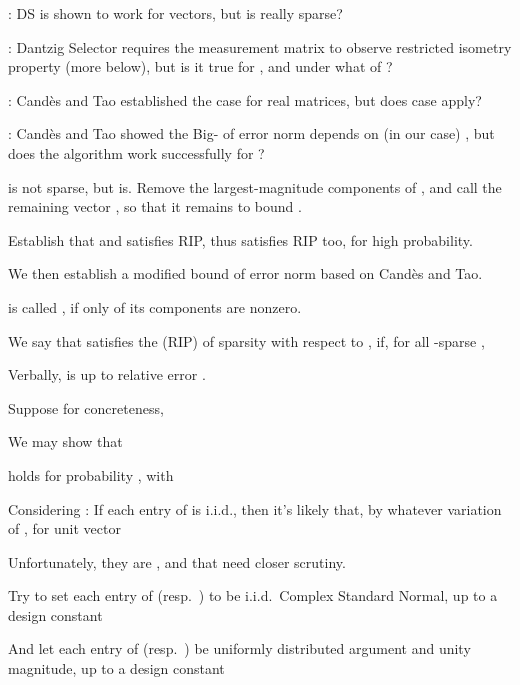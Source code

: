 {
\I {}: DS is shown to work for  vectors, but is  really sparse?

\I {}: Dantzig Selector requires the measurement matrix to observe restricted isometry property (more below), but is it true for , and under what  of ?

\I {}: Candès and Tao established the case for real matrices, but does  case apply?

\I {}: Candès and Tao showed the Big- of error norm depends on (in our case) , but does the algorithm work successfully for ?
}
{
\I {} is not sparse, but  is.
Remove the largest-magnitude  components of , and call the remaining vector , so that it remains to bound .

\I Establish that  and  satisfies RIP, thus  satisfies RIP too, for high probability.

\I We then establish a modified bound of error norm based on Candès and Tao.
}
{
\I {} is called , if only  of its components are nonzero.

\I We say that  satisfies the  (RIP) of sparsity  with respect to , if, for all -sparse ,

\I Verbally,  is  up to relative error .
}
{
\I Suppose for concreteness,

\I We may show that 

\I holds for probability , with
}
{
\I Considering : If each entry of  is i.i.d., then it's likely that, by whatever variation of , for unit vector 

\I Unfortunately, they are , and that need closer scrutiny.

\I Try to set each entry of  (resp.\ ) to be i.i.d.\ Complex Standard Normal, up to a design constant

\I And let each entry of  (resp.\ ) be uniformly distributed argument and unity magnitude, up to a design constant
}
